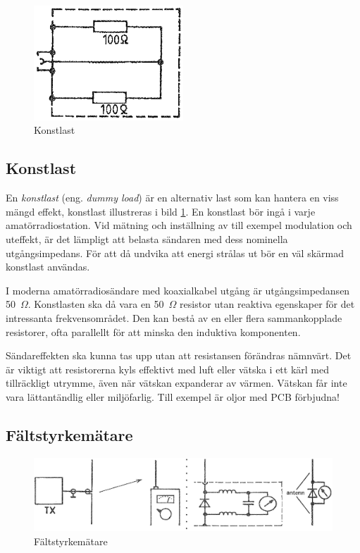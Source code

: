 \begin{figure}
  \includegraphics[width=0.5\textwidth]{images/cropped_pdfs/bild_2_8-05.pdf}
  \caption{Konstlast}
  \label{fig:bildII8-5}
\end{figure}

\subsection{Konstlast}

En \emph{konstlast} (eng. \emph{dummy load}) är en alternativ last som kan
hantera en viss mängd effekt, konstlast illustreras i bild \ref{fig:bildII8-5}.
En konstlast bör ingå i varje amatörradiostation.
Vid mätning och inställning av till exempel modulation och uteffekt, är det lämpligt
att belasta sändaren med dess nominella utgångsimpedans.
För att då undvika att energi strålas ut bör en väl skärmad konstlast användas.

I moderna amatörradiosändare med koaxialkabel utgång är utgångsimpedansen
50~\(\Omega\).
Konstlasten ska då vara en 50~\(\Omega\) resistor utan reaktiva egenskaper
för det intressanta frekvensområdet.
Den kan bestå av en eller flera sammankopplade resistorer, ofta parallellt för
att minska den induktiva komponenten.

Sändareffekten ska kunna tas upp utan att resistansen förändras nämnvärt.
Det är viktigt att resistorerna kyls effektivt med luft eller vätska i ett kärl
med tillräckligt utrymme, även när vätskan expanderar av värmen.
Vätskan får inte vara lättantändlig eller miljöfarlig.
Till exempel är oljor med PCB förbjudna!

\subsection{Fältstyrkemätare}

\begin{figure}
  \includegraphics[width=\textwidth]{images/cropped_pdfs/bild_2_8-06.pdf}
  \caption{Fältstyrkemätare}
  \label{fig:bildII8-6}
\end{figure}

